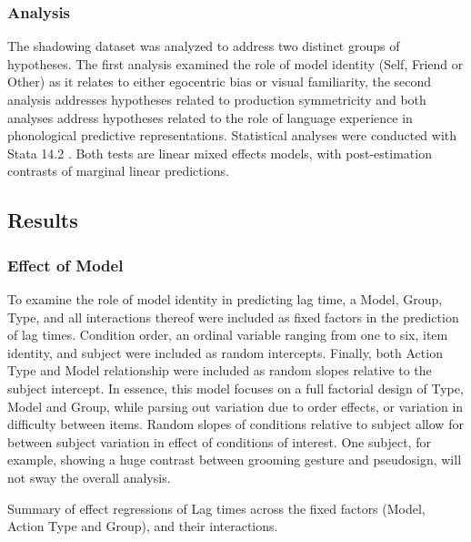     \subsubsection{Analysis}
                The shadowing dataset was analyzed to address two distinct groups of hypotheses. The first analysis examined the role of model identity (Self, Friend or Other) as it relates to either egocentric bias or visual familiarity, the second analysis addresses hypotheses related to production symmetricity and both analyses address hypotheses related to the role of language experience in phonological predictive representations.  Statistical analyses were conducted with Stata 14.2 \cite{stata14}. Both tests are linear mixed effects models, with post-estimation contrasts of marginal linear predictions. \par     
    \subsection{Results}
        \subsubsection{Effect of Model}
            To examine the role of model identity in predicting lag time, a Model, Group, Type, and all interactions thereof were included as fixed factors in the prediction of lag times. Condition order, an ordinal variable ranging from one to six, item identity, and subject were included as random intercepts. Finally, both Action Type and Model relationship were included as random slopes relative to the subject intercept. In essence, this model focuses on a full factorial design of Type, Model and Group, while parsing out variation due to order effects, or variation in difficulty between items. Random slopes of conditions relative to subject allow for between subject variation in effect of conditions of interest. One subject, for example, showing a huge contrast between grooming gesture and pseudosign, will not sway the overall analysis. \par

 

            \begin{table}[!h]\centering \begin{threeparttable}
                \caption[Shadowing effect of Model, mixed effect model]{Summary of effect regressions of Lag times across the fixed factors (Model, Action Type and Group), and their interactions.} \label{tab:shad_lme_ego}  
            \end{threeparttable} \end{table}
            



